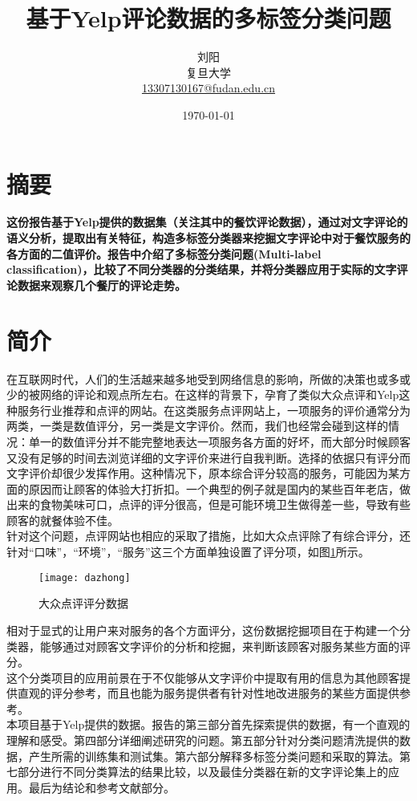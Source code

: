 \documentclass[a4paper, twocolumn]{article}
\title{基于Yelp评论数据的多标签分类问题} %
\author{%
	\textsc{刘阳} \\[1ex] %
	\normalsize 复旦大学 \\ %
	\normalsize \href{mailto:13307130167@fudan.edu.cn}{13307130167@fudan.edu.cn} %
}
\date{\today} %
\begin{document}
\begin{CJK}{UTF8}{gbsn}
	\maketitle
	
	
	\section{\textbf{摘要}}
	\textbf{这份报告基于Yelp提供的数据集（关注其中的餐饮评论数据），通过对文字评论的语义分析，提取出有关特征，构造多标签分类器来挖掘文字评论中对于餐饮服务的各方面的二值评价。报告中介绍了多标签分类问题(Multi-label classification)，比较了不同分类器的分类结果，并将分类器应用于实际的文字评论数据来观察几个餐厅的评论走势。}
	
	\section{简介}
	在互联网时代，人们的生活越来越多地受到网络信息的影响，所做的决策也或多或少的被网络的评论和观点所左右。在这样的背景下，孕育了类似大众点评和Yelp这种服务行业推荐和点评的网站。在这类服务点评网站上，一项服务的评价通常分为两类，一类是数值评分，另一类是文字评价。然而，我们也经常会碰到这样的情况：单一的数值评分并不能完整地表达一项服务各方面的好坏，而大部分时候顾客又没有足够的时间去浏览详细的文字评价来进行自我判断。选择的依据只有评分而文字评价却很少发挥作用。这种情况下，原本综合评分较高的服务，可能因为某方面的原因而让顾客的体验大打折扣。一个典型的例子就是国内的某些百年老店，做出来的食物美味可口，点评的评分很高，但是可能环境卫生做得差一些，导致有些顾客的就餐体验不佳。\\
	针对这个问题，点评网站也相应的采取了措施，比如大众点评除了有综合评分，还针对“口味”，“环境”，“服务”这三个方面单独设置了评分项，如图\ref{fig:dazhong}所示。
	\begin{figure}[h]
	\centering
	\texttt{[image: dazhong]}
	\caption{大众点评评分数据}
	\label{fig:dazhong}
	\end{figure}
	\newline
	相对于显式的让用户来对服务的各个方面评分，这份数据挖掘项目在于构建一个分类器，能够通过对顾客文字评价的分析和挖掘，来判断该顾客对服务某些方面的评分。\\
	这个分类项目的应用前景在于不仅能够从文字评价中提取有用的信息为其他顾客提供直观的评分参考，而且也能为服务提供者有针对性地改进服务的某些方面提供参考。\\
	本项目基于Yelp提供的数据\cite{yelp}。报告的第三部分首先探索提供的数据，有一个直观的理解和感受。第四部分详细阐述研究的问题。第五部分针对分类问题清洗提供的数据，产生所需的训练集和测试集。第六部分解释多标签分类问题和采取的算法。第七部分进行不同分类算法的结果比较，以及最佳分类器在新的文字评论集上的应用。最后为结论和参考文献部分。
	

\end{CJK}
\end{document}
